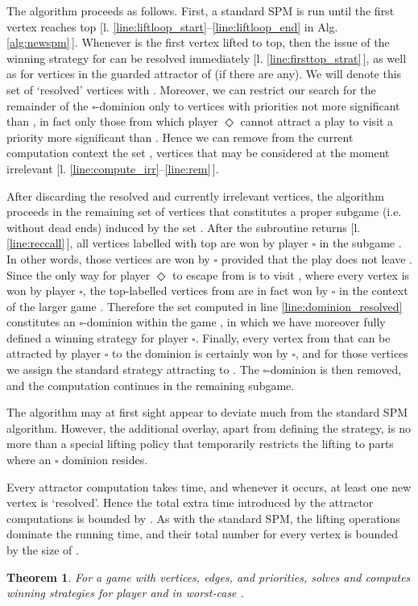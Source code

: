 \documentclass{eptcs}
\newtheorem{theo}{Theorem}
\newenvironment{theorem}{\begin{theo} \rm }{\end{theo}}
\newcommand{\odd}{\ensuremath{\square}\xspace}
\newcommand{\even}{\ensuremath{\Diamond}\xspace}
\begin{document}
The algorithm proceeds as follows. First, a standard SPM is run until the first vertex reaches top [l. \ref{line:liftloop_start}--\ref{line:liftloop_end} in Alg. \ref{alg:newspm}\,]. Whenever  is the first vertex lifted to top, then the issue of the winning strategy for  can be resolved immediately [l. \ref{line:firsttop_strat}\,], as well as for vertices in the guarded attractor of  (if there are any). We will denote this set of `resolved' vertices with . Moreover, we can restrict our search for the remainder of the \odd-dominion  only to vertices with priorities not more significant than , in fact only those from which player \even cannot attract a play to visit a priority more significant than . Hence we can remove from the current computation context the set , vertices that may be considered at the moment irrelevant [l. \ref{line:compute_irr}--\ref{line:rem}\,].

After discarding the resolved and currently irrelevant vertices, the algorithm proceeds in the remaining set of vertices that constitutes a proper subgame (i.e. without dead ends) induced by the set . After the subroutine returns [l. \ref{line:reccall}\,], all vertices labelled with top are won by player \odd in the subgame . In other words, those vertices are won by \odd provided that the play does not leave . Since the only way for player \even to escape from  is to visit , where every vertex is won by player \odd, the top-labelled vertices from  are in fact won by \odd in the context of the larger game . Therefore the set  computed in line \ref{line:dominion_resolved} constitutes an \odd-dominion within the game , in which we have moreover fully defined a winning strategy  for player \odd. Finally, every vertex from  that can be attracted by player \odd to the dominion  is certainly won by \odd, and for those vertices we assign the standard strategy attracting to . The \odd-dominion  is then removed, and the computation continues in the remaining subgame. 
\medskip

The algorithm may at first sight appear to deviate much from the
standard SPM algorithm. However, the additional overlay, apart from
defining the strategy, is no more than a special lifting policy that
temporarily restricts the lifting to parts where an \odd dominion
resides. \medskip

Every attractor computation takes 
time, and whenever it occurs, at least one new vertex is `resolved'.
Hence the total extra time introduced by the attractor computations
is bounded by . As with the standard SPM, the lifting
operations dominate the running time, and their total number for
every vertex is bounded by the size of .
\begin{theorem}
For a game  with  vertices,  edges, and
 priorities,  solves  and computes winning
strategies for player  and  in worst-case .
\end{theorem}
\end{document}

